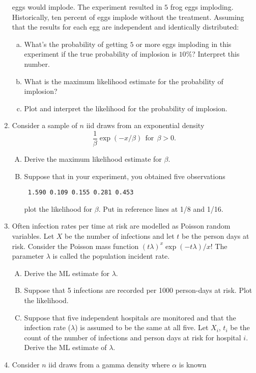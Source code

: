 \documentclass[12pt]{article}
\begin{document}
\begin{enumerate}[1.]
  eggs would implode. The experiment resulted in $5$ frog eggs
  imploding.  Historically, ten percent of eggs implode without the
  treatment. Assuming that the results for each egg are independent
  and identically distributed:
  \begin{enumerate}[a.]
  \item What's the probability of getting $5$ or more eggs imploding
    in this experiment if the true probability of implosion is $10\%$?
    Interpret this number.
  \item What is the maximum likelihood estimate for the probability of
    implosion?
  \item Plot and interpret the likelihood for the probability of implosion.
  \end{enumerate}
\item Consider a sample of $n$ iid draws from an exponential density
$$
\frac{1}{\beta}\exp(-x / \beta) ~~\mbox{for}~~ \beta > 0.
$$
\begin{enumerate}[A.]
\item Derive the maximum likelihood estimate for $\beta$.
\item Suppose that in your experiment, you obtained five
observations 
\begin{verbatim}
 1.590 0.109 0.155 0.281 0.453
\end{verbatim}
plot the likelihood for $\beta$. Put in reference lines at 1/8 and 1/16.
\end{enumerate}
\item Often infection rates per time at risk are modelled as Poisson
random variables. Let $X$ be the number of infections and let $t$ be the 
person days at risk. Consider the Poisson mass function
$
(t\lambda)^x \exp(-t\lambda) / x!
$
The parameter $\lambda$ is called the population incident rate.
\begin{enumerate}[A.]
\item Derive the ML estimate for $\lambda$.
\item Suppose that 5 infections are recorded per 1000 person-days at risk. Plot the likelihood.
\item Suppose that five independent hospitals are monitored and that the infection rate ($\lambda$) is assumed to be the same at all five. Let $X_i$, $t_i$ be the count of the number of infections
and person days at risk for hospital $i$. Derive the ML estimate of $\lambda$.
\end{enumerate}
\item Consider $n$ iid draws from a gamma density where $\alpha$ is known

\end{enumerate}
\end{document}
